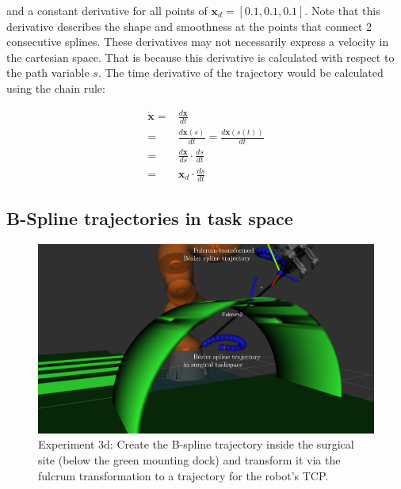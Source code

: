 and a constant derivative for all points of $\mathbf{x}_d = [0.1, 0.1, 0.1]$. Note that this derivative describes the shape and smoothness at the points that connect 
2 consecutive splines. These derivatives may not necessarily express a velocity in the cartesian space. That is because this derivative is calculated with respect 
to the path variable $s$. The time derivative of the trajectory would be calculated using the chain rule:

\begin{equation}
\begin{aligned}
\mathbf{\dot{x}} ={}& \frac{d\mathbf{x}}{dt}  \\
	={}& \frac{d\mathbf{x}(s)}{dt} = \frac{d\mathbf{x}(s(t))}{dt}   \\
    ={}& \frac{d\mathbf{x}}{ds} \cdot \frac{ds}{dt} \\
    ={}& \mathbf{x}_d \cdot \frac{ds}{dt}
\end{aligned}
\end{equation}


\subsection{B-Spline trajectories in task space}

\begin{center}
\begin{figure}[!htb]
\centering
\includegraphics[width=\textwidth]{images/robot_planner3/3d_bezier_spline.png}
\caption{Experiment 3d: Create the B-spline trajectory inside the surgical site (below the green mounting dock) and transform it via the fulcrum transformation to a trajectory for the robot's TCP.}
\label{robot-planner3d-bezier-spline}
\end{figure}
\end{center}


